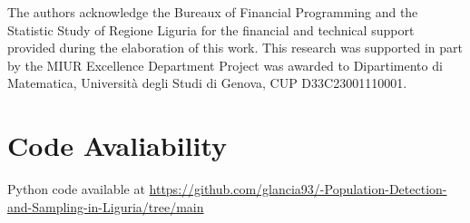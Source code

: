 The authors acknowledge the Bureaux of Financial Programming and the Statistic Study of Regione Liguria for the financial and technical support provided during the elaboration of this work. 
This research was supported in part by the MIUR Excellence Department Project was awarded to Dipartimento di Matematica, Università degli Studi di Genova, CUP D33C23001110001.

\section*{Code Avaliability}
Python code available at \url{https://github.com/glancia93/-Population-Detection-and-Sampling-in-Liguria/tree/main}

  
  


